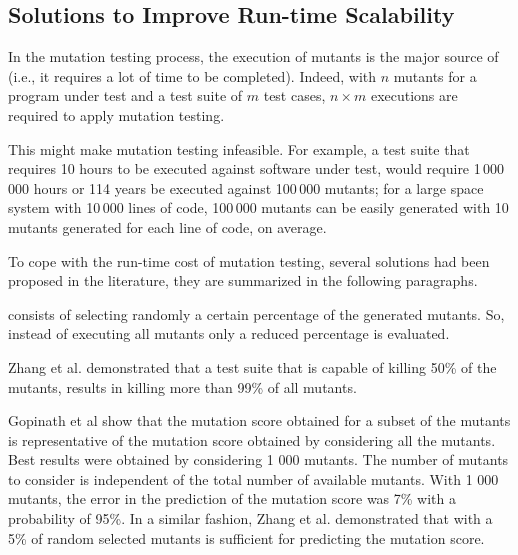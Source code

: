 \clearpage
\subsection{Solutions to Improve Run-time Scalability}
\label{sec:opt:execution}

In the mutation testing process, the execution of mutants is the major source of  (i.e., it requires a lot of time to be completed). Indeed, with $n$ mutants for a program under test and a test suite of $m$ test cases, $n \times m$ executions are required to apply mutation testing.

This might make mutation testing infeasible. For example, a test suite that requires 10 hours to be executed against software under test, would require 1\,000\,000 hours or 114 years be executed against 100\,000 mutants; for a large space system with 10\,000 lines of code, 100\,000 mutants can be easily generated  with 10 mutants generated for each line of code, on average.

To cope with the run-time cost of mutation testing, several solutions had been proposed in the literature, they are summarized in the following paragraphs.

 consists of selecting randomly a certain percentage of the generated mutants. So, instead of executing all mutants only a reduced percentage is evaluated.

Zhang et al. \cite{zhang2010operator} demonstrated that a test suite that is capable of killing 50\% of the mutants, results in killing more than 99\% of all mutants.

Gopinath et al \cite{gopinath2015hard} show that the mutation score obtained for a subset of the mutants is representative of the mutation score obtained by considering all the mutants. Best results were obtained by considering 1 000 mutants. The number of mutants to consider is independent of the total number of available mutants. With 1 000 mutants, the error in the prediction of the mutation score was 7\% with a probability of 95\%. 
In a similar fashion, Zhang et al. \cite{zhang2013operator} demonstrated that with a 5\% of random selected mutants is sufficient for predicting the mutation score.

